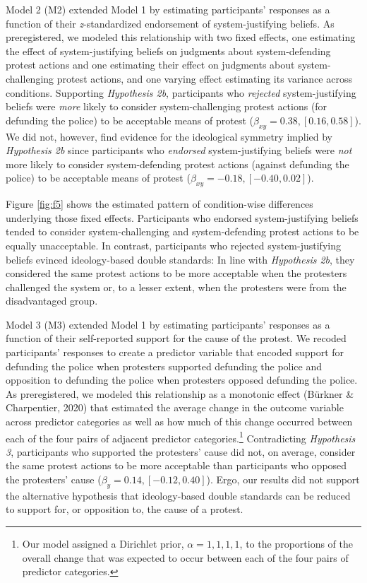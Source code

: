 \documentclass[12pt, letterpaper]{article}
\begin{document}
Model 2 (M2) extended Model 1 by estimating participants' responses as a
function of their \emph{z}-standardized endorsement of system-justifying
beliefs. As preregistered, we modeled this relationship with two fixed
effects, one estimating the effect of system-justifying beliefs on
judgments about system-defending protest actions and one estimating
their effect on judgments about system-challenging protest actions, and
one varying effect estimating its variance across conditions. Supporting
\emph{Hypothesis 2b}, participants who \emph{rejected} system-justifying
beliefs were \emph{more} likely to consider system-challenging protest
actions (for defunding the police) to be acceptable means of protest
(\(\beta_{xy} = 0.38, [0.16, 0.58]\)). We did not, however, find
evidence for the ideological symmetry implied by \emph{Hypothesis 2b}
since participants who \emph{endorsed} system-justifying beliefs were
\emph{not} more likely to consider system-defending protest actions
(against defunding the police) to be acceptable means of protest
(\(\beta_{xy} = -0.18, [-0.40, 0.02]\)).

Figure \ref{fig:f5} shows the estimated pattern of condition-wise
differences underlying those fixed effects. Participants who endorsed
system-justifying beliefs tended to consider system-challenging and
system-defending protest actions to be equally unacceptable. In
contrast, participants who rejected system-justifying beliefs evinced
ideology-based double standards: In line with \emph{Hypothesis 2b}, they
considered the same protest actions to be more acceptable when the
protesters challenged the system or, to a lesser extent, when the
protesters were from the disadvantaged group.

Model 3 (M3) extended Model 1 by estimating participants' responses as a
function of their self-reported support for the cause of the protest. We
recoded participants' responses to create a predictor variable that
encoded support for defunding the police when protesters supported
defunding the police and opposition to defunding the police when
protesters opposed defunding the police. As preregistered, we modeled
this relationship as a monotonic effect (Bürkner \& Charpentier, 2020)
that estimated the average change in the outcome variable across
predictor categories as well as how much of this change occurred between
each of the four pairs of adjacent predictor categories.\footnote{Our
  model assigned a Dirichlet prior, \(\alpha = {1, 1, 1, 1}\), to the
  proportions of the overall change that was expected to occur between
  each of the four pairs of predictor categories.} Contradicting
\emph{Hypothesis 3}, participants who supported the protesters' cause
did not, on average, consider the same protest actions to be more
acceptable than participants who opposed the protesters' cause
(\(\beta_{y} = 0.14, [-0.12, 0.40]\)). Ergo, our results did not support
the alternative hypothesis that ideology-based double standards can be
reduced to support for, or opposition to, the cause of a protest.
\end{document}
